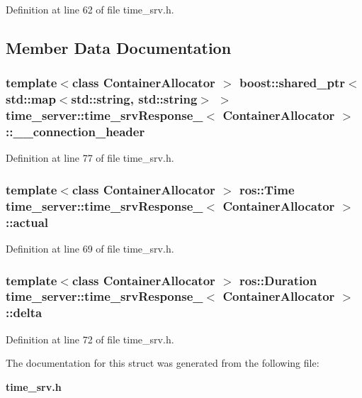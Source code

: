 \-Definition at line 62 of file time\-\_\-srv.\-h.



\subsection{\-Member \-Data \-Documentation}
\subsubsection[{\-\_\-\-\_\-connection\-\_\-header}]{\setlength{\rightskip}{0pt plus 5cm}template$<$class Container\-Allocator $>$ boost\-::shared\-\_\-ptr$<$std\-::map$<$std\-::string, std\-::string$>$ $>$ {\bf time\-\_\-server\-::time\-\_\-srv\-Response\-\_\-}$<$ \-Container\-Allocator $>$\-::{\bf \-\_\-\-\_\-connection\-\_\-header}}\label{structtime__server_1_1time__srvResponse___a10e53d6bd73bcad68fea10ffc651ba8d}


\-Definition at line 77 of file time\-\_\-srv.\-h.

\subsubsection[{actual}]{\setlength{\rightskip}{0pt plus 5cm}template$<$class Container\-Allocator $>$ ros\-::\-Time {\bf time\-\_\-server\-::time\-\_\-srv\-Response\-\_\-}$<$ \-Container\-Allocator $>$\-::{\bf actual}}\label{structtime__server_1_1time__srvResponse___a087962d8f351f79a0fdd432e1f62c924}


\-Definition at line 69 of file time\-\_\-srv.\-h.

\subsubsection[{delta}]{\setlength{\rightskip}{0pt plus 5cm}template$<$class Container\-Allocator $>$ ros\-::\-Duration {\bf time\-\_\-server\-::time\-\_\-srv\-Response\-\_\-}$<$ \-Container\-Allocator $>$\-::{\bf delta}}\label{structtime__server_1_1time__srvResponse___a2bff409ca5c4f8dd0a76c4ece3906295}


\-Definition at line 72 of file time\-\_\-srv.\-h.



\-The documentation for this struct was generated from the following file\-:\begin{DoxyCompactItemize}
\item 
{\bf time\-\_\-srv.\-h}\end{DoxyCompactItemize}
